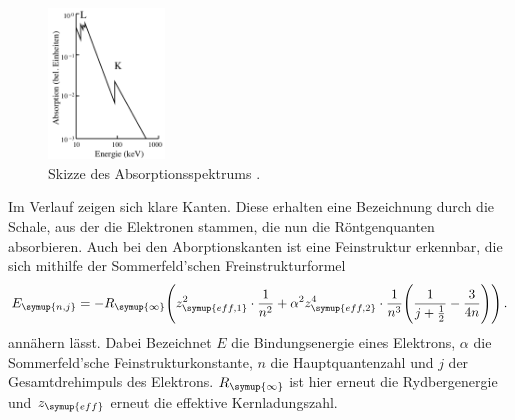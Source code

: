 \begin{figure}
  \centering
  \includegraphics[height=4cm]{data/absorption.png}
  \caption{Skizze des Absorptionsspektrums \cite{Versuchsanleitung}.}
  \label{fig:absorption}
\end{figure}

Im Verlauf zeigen sich klare Kanten. Diese erhalten eine Bezeichnung durch die
Schale, aus der die Elektronen stammen, die nun die Röntgenquanten absorbieren.
Auch bei den Aborptionskanten ist eine Feinstruktur erkennbar, die sich mithilfe
der Sommerfeld'schen Freinstrukturformel
\begin{equation}
  E_{\symup{n,j}}=-R_{\symup{\infty}}\Biggl(z_{\symup{eff,1}}^2\cdot \frac{1}{n^2} +
   \alpha^2 z_{\symup{eff,2}}^4\cdot \frac{1}{n^3}\Biggl(\frac{1}{j+\frac{1}{2}} -
   \frac{3}{4n}\Biggr)\Biggr) \,.
   \label{eqn:sommerfeld}
\end{equation}
annähern lässt. Dabei Bezeichnet $E$ die Bindungsenergie eines Elektrons, $\alpha$ die Sommerfeld'sche
Feinstrukturkonstante, $n$ die Hauptquantenzahl und $j$ der Gesamtdrehimpuls des
Elektrons. $R_{\symup{\infty}}$ ist hier erneut die Rydbergenergie und $z_{\symup{eff}}$ erneut
die effektive Kernladungszahl.

